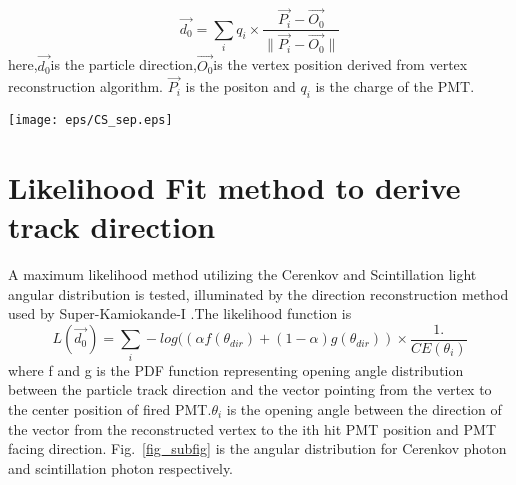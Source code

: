 \documentclass[a4paper,10pt]{cpc-hepnp}
\begin{document}
\begin{equation}
\label{eq1}
\vec{d_0} = \sum_i{q_i\times{\frac{\vec{P_i}- \vec{O_0}}{\|\vec{P_i}-
\vec{O_0}\|}}}
\end{equation}
here,$\vec{d_0}$is the particle direction,$\vec{O_0}$is the vertex position
derived from vertex reconstruction algorithm.
 $\vec{P_i}$ is the positon and $q_i$ is the charge of the PMT.

\begin{center}
\texttt{[image: eps/CS\_sep.eps]}
\end{center}


\section{Likelihood Fit method to derive track direction}
A maximum likelihood method utilizing the Cerenkov and Scintillation light
angular distribution is tested, illuminated by the direction reconstruction
method used by Super-Kamiokande-I \cite{super-k-I}.The likelihood function is
\begin{equation}
\label{eq2}
L(\vec{d_0}) = \sum_i-log((\alpha f(\theta_{dir})+(1-\alpha)g(\theta_{dir}))\times\frac{1.}{CE(\theta_i)}
\end{equation}
where f and g is the PDF function representing opening angle distribution
between the particle track direction and the vector pointing from the vertex to
the center position of fired PMT.$\theta_i$ is the opening angle between the
direction of the vector from the reconstructed vertex to the ith hit PMT
position and PMT  facing  direction. Fig.~\ref{fig_subfig} is the angular distribution
for Cerenkov photon and scintillation photon respectively.

\begin{figure*}[htbp]
\centering
{}
\label{fig_subfig}
\caption{angular distribution}
\end{figure*}
\end{document}
